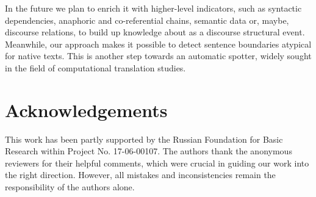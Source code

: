 \documentclass[output=paper]{langsci/langscibook.cls}
\begin{document}
In the future we plan to enrich it with higher-level indicators, such as syntactic dependencies, anaphoric and co-referential chains, semantic data or, maybe, discourse relations, to build up knowledge about  as a discourse structural event. Meanwhile, our approach makes it possible to detect sentence boundaries atypical for native texts. This is another step towards an automatic  spotter, widely sought in the field of computational translation studies.

\section{Acknowledgements}
This work has been partly supported by the Russian Foundation for Basic Research within Project No. 17-06-00107. The authors thank the anonymous reviewers for their helpful comments, which were crucial in guiding our work into the right direction. However, all mistakes and inconsistencies remain the responsibility of the authors alone.
 {\sloppy
 \printbibliography[heading=subbibliography,notkeyword=this] 
 }
\end{document}
